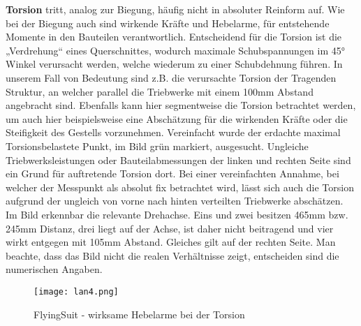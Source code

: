 \textbf{Torsion} tritt, analog zur Biegung, häufig nicht in absoluter Reinform auf. Wie bei der Biegung auch sind wirkende Kräfte und Hebelarme,
für entstehende Momente in den Bauteilen verantwortlich. Entscheidend für die Torsion ist die „Verdrehung“ eines Querschnittes,
wodurch maximale Schubspannungen im 45° Winkel verursacht werden, welche wiederum zu einer Schubdehnung führen.
In unserem Fall von Bedeutung sind z.B. die verursachte Torsion der Tragenden Struktur, an welcher parallel die Triebwerke mit einem 100mm Abstand angebracht sind.
Ebenfalls kann hier segmentweise die Torsion betrachtet werden, um auch hier beispielsweise eine Abschätzung für die wirkenden Kräfte oder die Steifigkeit des Gestells vorzunehmen.
Vereinfacht wurde der erdachte maximal Torsionsbelastete Punkt, im Bild grün markiert, ausgesucht.
Ungleiche Triebwerksleistungen oder Bauteilabmessungen der linken und rechten Seite sind ein Grund für auftretende Torsion dort.
Bei einer vereinfachten Annahme, bei welcher der Messpunkt als absolut fix betrachtet wird,
lässt sich auch die Torsion aufgrund der ungleich von vorne nach hinten verteilten Triebwerke abschätzen.
Im Bild erkennbar die relevante Drehachse. Eins und zwei besitzen 465mm bzw. 245mm Distanz, drei liegt auf der Achse,
ist daher nicht beitragend und vier wirkt entgegen mit 105mm Abstand. Gleiches gilt auf der rechten Seite.
Man beachte, dass das Bild nicht die realen Verhältnisse zeigt, entscheiden sind die numerischen Angaben.

\begin{figure}[htbp]
    \begin{center}
        \texttt{[image: lan4.png]}
        \caption[FlyingSuit - wirksame Hebelarme bei der Torsion (Abbildungsverzeichnis)]{FlyingSuit - wirksame Hebelarme bei der Torsion}
        
        \label{fig:lan4}
    \end{center}
\end{figure}

\clearpage
